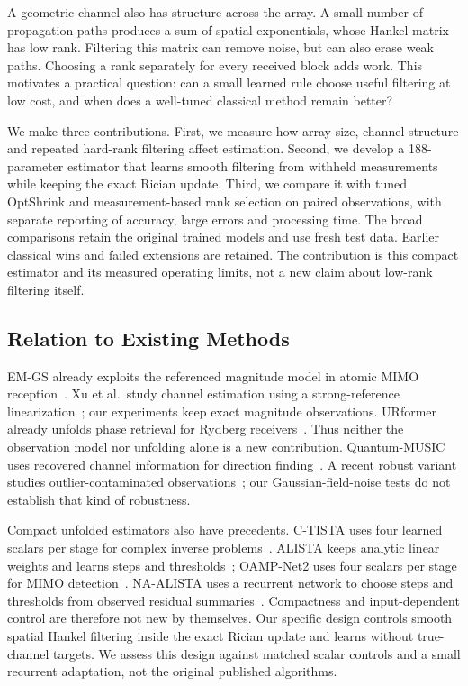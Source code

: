 \documentclass[10pt,journal,letterpaper]{IEEEtran}
\begin{document}
A geometric channel also has structure across the array. A small number of propagation paths produces a sum of spatial exponentials, whose Hankel matrix has low rank. Filtering this matrix can remove noise, but can also erase weak paths. Choosing a rank separately for every received block adds work. This motivates a practical question: can a small learned rule choose useful filtering at low cost, and when does a well-tuned classical method remain better?

We make three contributions. First, we measure how array size, channel structure and repeated hard-rank filtering affect estimation. Second, we develop a 188-parameter estimator that learns smooth filtering from withheld measurements while keeping the exact Rician update. Third, we compare it with tuned OptShrink and measurement-based rank selection on paired observations, with separate reporting of accuracy, large errors and processing time. The broad comparisons retain the original trained models and use fresh test data. Earlier classical wins and failed extensions are retained. The contribution is this compact estimator and its measured operating limits, not a new claim about low-rank filtering itself.

\subsection{Relation to Existing Methods}
EM-GS already exploits the referenced magnitude model in atomic MIMO reception~\cite{cui2025}. Xu et al.\ study channel estimation using a strong-reference linearization~\cite{xu2025}; our experiments keep exact magnitude observations. URformer already unfolds phase retrieval for Rydberg receivers~\cite{xiao2026}. Thus neither the observation model nor unfolding alone is a new contribution. Quantum-MUSIC uses recovered channel information for direction finding~\cite{kim2025quantummusic}. A recent robust variant studies outlier-contaminated observations~\cite{banerjee2026robust}; our Gaussian-field-noise tests do not establish that kind of robustness.

Compact unfolded estimators also have precedents. C-TISTA uses four learned scalars per stage for complex inverse problems~\cite{takabe2020ctista}. ALISTA keeps analytic linear weights and learns steps and thresholds~\cite{liu2019alista}; OAMP-Net2 uses four scalars per stage for MIMO detection~\cite{he2020oamp}. NA-ALISTA uses a recurrent network to choose steps and thresholds from observed residual summaries~\cite{behrens2021naalista}. Compactness and input-dependent control are therefore not new by themselves. Our specific design controls smooth spatial Hankel filtering inside the exact Rician update and learns without true-channel targets. We assess this design against matched scalar controls and a small recurrent adaptation, not the original published algorithms.
\end{document}
